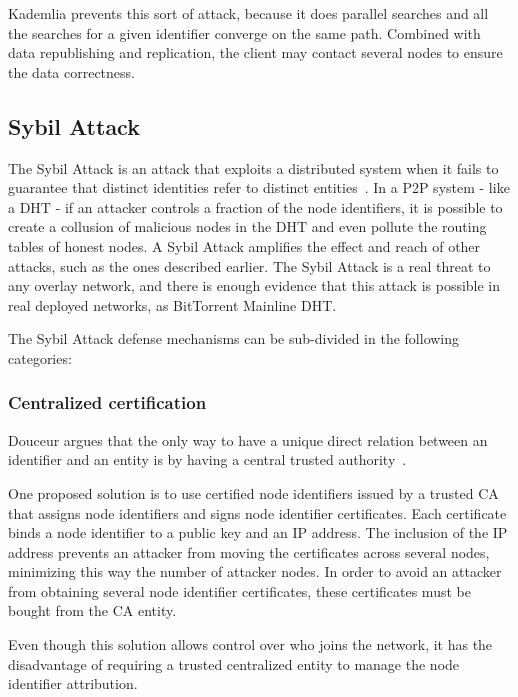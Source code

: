 Kademlia prevents this sort of attack, because it does parallel searches and all the searches for a given identifier converge on the same path. Combined with data republishing and replication, the client may contact several nodes to ensure the data correctness.

\subsection{Sybil Attack}


The Sybil Attack is an attack that exploits a
distributed system when it fails to guarantee that distinct identities refer to
distinct entities~\cite{Douceur2002}.
In a \ac{P2P} system - like a \ac{DHT} - if an attacker
controls a fraction of the node identifiers, it is possible to create a collusion
of malicious nodes in the \ac{DHT} and even pollute the routing tables of honest
nodes.
A Sybil Attack amplifies the effect and reach of other attacks, such as the ones described earlier.
The Sybil Attack is a real threat to any overlay network, and there is enough evidence that this attack is possible in real deployed networks, as BitTorrent Mainline \ac{DHT}\cite{Wang2012}.

The Sybil Attack defense mechanisms can be sub-divided in the following categories:

\subsubsection{Centralized certification}
Douceur argues that the only way to have a unique direct relation between an
identifier and an entity is by having a central trusted authority~\cite{Douceur2002}.

One proposed solution is to use certified node identifiers\cite{Castro2002} issued by a trusted \ac{CA} that assigns node identifiers and signs node identifier certificates.
Each certificate binds a node identifier to a public key and an IP address.
The inclusion of the IP address prevents an attacker from moving the certificates across several nodes, minimizing this way the number of attacker nodes.
In order to avoid an attacker from obtaining several node identifier certificates, these certificates must be bought from the \ac{CA} entity.

Even though this solution allows control over who joins the network, it has the disadvantage of requiring a trusted centralized entity to manage the node identifier attribution.

